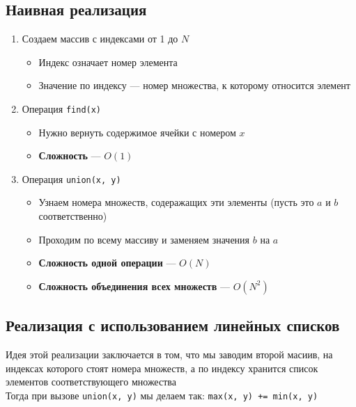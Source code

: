 \documentclass[a4paper]{article}
\newcommand{\code}[1]{\colorbox{codegray}{\texttt{#1}}}
\begin{document}
\subsection{Наивная реализация}
\begin{enumerate}
    \item Создаем массив с индексами от 1 до $N$
    \begin{itemize}
        \item Индекс означает номер элемента
        \item Значение по индексу — номер множества, к которому относится элемент
    \end{itemize}
    \item Операция \code{find(x)}
    \begin{itemize}
        \item Нужно вернуть содержимое ячейки с номером $x$
        \item \textbf{Сложность} — $O(1)$
    \end{itemize}
    \item Операция \code{union(x, y)}
    \begin{itemize}
        \item Узнаем номера множеств, содеражащих эти элементы (пусть это $a$ и $b$ соответственно)
        \item Проходим по всему массиву и заменяем значения $b$ на $a$
        \item \textbf{Сложность одной операции} — $O(N)$
        \item \textbf{Сложность объединения всех множеств} — $O(N^2)$
    \end{itemize}
\end{enumerate}

\subsection{Реализация с использованием линейных списков}
Идея этой реализации заключается в том, что мы заводим второй масиив, на индексах которого стоят номера множеств, а по индексу хранится список элементов соответствующего множества\\[2mm]
\indent Тогда при вызове \code{union(x, y)} мы делаем так: \code{max(x, y) += min(x, y)}
\end{document}
